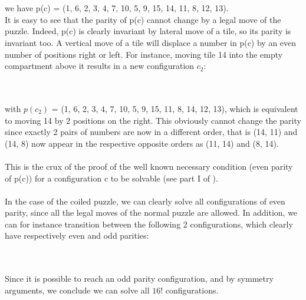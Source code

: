 \begin{fifteen}
\end{fifteen}
\\
\\
we have p(c) = (1, 6, 2, 3, 4, 7, 10, 5, 9, 15, 14, 11, 8, 12, 13).
\\
It is easy to see that the parity of p(c) cannot change by a legal move of the puzzle. Indeed, p(c) is clearly invariant by lateral move of a tile, so its parity is invariant too. A vertical move of a tile will displace a number in p(c) by an even number of positions right or left. For instance, moving tile 14 into the empty compartment above it results in a new configuration $c_{2}$:

\begin{fifteen}
\end{fifteen}
\\
\\
with $p(c_{2})$ = (1, 6, 2, 3, 4, 7, 10, 5, 9, 15, 11, 8, 14, 12, 13), which is equivalent to moving 14 by 2 positions on the right. This obviously cannot change the parity since exactly 2 pairs of numbers are now in a different order, that is (14, 11) and (14, 8) now appear in the respective opposite orders as (11, 14) and (8, 14).
\\
\\
This is the crux of the proof of the well known necessary condition (even parity of p(c)) for a configuration c to be solvable (see part I of \cite{Johnson1879}).
\\
\\
In the case of the coiled puzzle, we can clearly solve all configurations of even parity, since all the legal moves of the normal puzzle are allowed. In addition, we can for instance transition between the following 2 configurations, which clearly have respectively even and odd parities:

\begin{fifteen}
\end{fifteen}
%
\begin{fifteen}
\end{fifteen}
\\
\\
Since it is possible to reach an odd parity configuration, and by symmetry arguments, we conclude we can solve all $16!$ configurations. 


